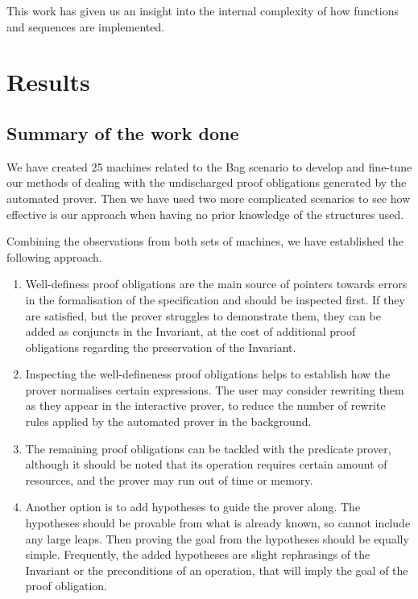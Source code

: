 \documentclass[12pt,journal,duplex]{IEEEtran}
\begin{document}
	This work has given us an insight into the internal complexity of how functions and sequences are implemented.

	\section{Results}
	\subsection{Summary of the work done}
	We have created 25 machines related to the Bag scenario to develop and fine-tune our methods of dealing with the undischarged proof obligations generated by the automated prover. Then we have used two more complicated scenarios to see how effective is our approach when having no prior knowledge of the structures used.

	Combining the observations from both sets of machines, we have established the following approach.
	\begin{enumerate}
		\item	Well-definess proof obligations are the main source of pointers towards errors in the formalisation of the specification and should be inspected first. If they are satisfied, but the prover struggles to demonstrate them, they can be added as conjuncts in the Invariant, at the cost of additional proof obligations regarding the preservation of the Invariant.

		\item Inspecting the well-defineness proof obligations helps to establish how the prover normalises certain expressions. The user may consider rewriting them as they appear in the interactive prover, to reduce the number of rewrite rules applied by the automated prover in the background.

		\item The remaining proof obligations can be tackled with the predicate prover, although it should be noted that its operation requires certain amount of resources, and the prover may run out of time or memory. 

		\item Another option is to add hypotheses to guide the prover along. The hypotheses should be provable from what is already known, so cannot include any large leaps. Then proving the goal from the hypotheses should be equally simple. Frequently, the added hypotheses are slight rephrasings of the Invariant or the preconditions of an operation, that will imply the goal of the proof obligation.
  \end{enumerate}
\end{document}
